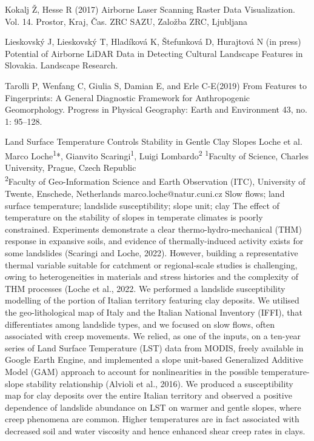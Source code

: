 {Kokalj Ž, Hesse R (2017) Airborne Laser Scanning Raster Data Visualization. Vol. 14. Prostor, Kraj, Čas. ZRC SAZU, Založba ZRC, Ljubljana
	
	Lieskovský J, Lieskovský T, Hladíková K, Štefunková D, Hurajtová N (in press) Potential of Airborne LiDAR Data in Detecting Cultural Landscape Features in Slovakia. Landscape Research.
	
	Tarolli P, Wenfang C, Giulia S, Damian E, and Erle C-E(2019) From Features to Fingerprints: A General Diagnostic Framework for Anthropogenic Geomorphology. Progress in Physical Geography: Earth and Environment 43, no. 1: 95–128.}%
\abstract
{Land Surface Temperature Controls Stability in Gentle Clay Slopes} 
{Loche et al.} 
{Marco Loche\textsuperscript{1}*, Gianvito Scaringi\textsuperscript{1}, Luigi Lombardo\textsuperscript{2}} 
{\KLtag} 
{
\textsuperscript{1}Faculty of Science, Charles University, Prague, Czech Republic\\
\textsuperscript{2}Faculty of Geo-Information Science and Earth Observation (ITC), University of Twente, Enschede, Netherlands
}
{marco.loche@natur.cuni.cz}  %
{Slow flows; land surface temperature; landslide susceptibility; slope unit; clay}
{The effect of temperature on the stability of slopes in temperate climates is poorly constrained. Experiments demonstrate a clear thermo-hydro-mechanical (THM) response in expansive soils, and evidence of thermally-induced activity exists for some landslides (Scaringi and Loche, 2022). However, building a representative thermal variable suitable for catchment or regional-scale studies is challenging, owing to heterogeneities in materials and stress histories and the complexity of THM processes (Loche et al., 2022. We performed a landslide susceptibility modelling of the portion of Italian territory featuring clay deposits. We utilised the geo-lithological map of Italy and the Italian National Inventory (IFFI), that differentiates among landslide types, and we focused on slow flows, often associated with creep movements. We relied, as one of the inputs, on a ten-year series of Land Surface Temperature (LST) data from MODIS, freely available in Google Earth Engine, and implemented a slope unit-based Generalized Additive Model (GAM) approach to account for nonlinearities in the possible temperature-slope stability relationship (Alvioli et al., 2016). We produced a susceptibility map for clay deposits over the entire Italian territory and observed a positive dependence of landslide abundance on LST on warmer and gentle slopes, where creep phenomena are common. Higher temperatures are in fact associated with decreased soil and water viscosity and hence enhanced shear creep rates in clays.
}
